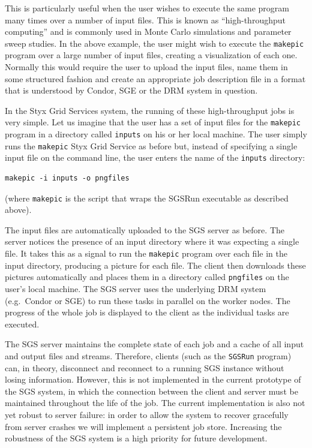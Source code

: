 \documentclass[times,10pt,twocolumn,8.5x11]{article}
\begin{document}
This is particularly useful when the user wishes to execute the same program many times over a number of input files.  This is known as ``high-throughput computing'' and is commonly used in Monte Carlo simulations and parameter sweep studies.  In the above example, the user might wish to execute the {\tt makepic} program over a large number of input files, creating a visualization of each one.  Normally this would require the user to upload the input files, name them in some structured fashion and create an appropriate job description file in a format that is understood by Condor, SGE or the DRM system in question.

In the Styx Grid Services system, the running of these high-throughput jobs is very simple.  Let us imagine that the user has a set of input files for the {\tt makepic} program in a directory called {\tt inputs} on his or her local machine.  The user simply runs the {\tt makepic} Styx Grid Service as before but, instead of specifying a single input file on the command line, the user enters the name of the {\tt inputs} directory:

\begin{verbatim}
makepic -i inputs -o pngfiles
\end{verbatim}

\noindent (where {\tt makepic} is the script that wraps the SGSRun executable as described above).

The input files are automatically uploaded to the SGS server as before.  The server notices the presence of an input directory where it was expecting a single file.  It takes this as a signal to run the {\tt makepic} program over each file in the input directory, producing a picture for each file.  The client then downloads these pictures automatically and places them in a directory called {\tt pngfiles} on the user's local machine.  The SGS server uses the underlying DRM system (e.g.\ Condor or SGE) to run these tasks in parallel on the worker nodes.  The progress of the whole job is displayed to the client as the individual tasks are executed.

The SGS server maintains the complete state of each job and a cache of all input and output files and streams.  Therefore, clients (such as the {\tt SGSRun} program) can, in theory, disconnect and reconnect to a running SGS instance without losing information.  However, this is not implemented in the current prototype of the SGS system, in which the connection between the client and server must be maintained throughout the life of the job.  The current implementation is also not yet robust to server failure: in order to allow the system to recover gracefully from server crashes we will implement a persistent job store.  Increasing the robustness of the SGS system is a high priority for future development.
\end{document}
